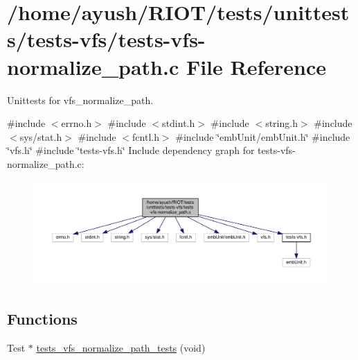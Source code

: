 \hypertarget{tests-vfs-normalize__path_8c}{}\section{/home/ayush/\+R\+I\+O\+T/tests/unittests/tests-\/vfs/tests-\/vfs-\/normalize\+\_\+path.c File Reference}
\label{tests-vfs-normalize__path_8c}


Unittests for vfs\+\_\+normalize\+\_\+path.  


{\ttfamily \#include $<$errno.\+h$>$}\newline
{\ttfamily \#include $<$stdint.\+h$>$}\newline
{\ttfamily \#include $<$string.\+h$>$}\newline
{\ttfamily \#include $<$sys/stat.\+h$>$}\newline
{\ttfamily \#include $<$fcntl.\+h$>$}\newline
{\ttfamily \#include \char`\"{}emb\+Unit/emb\+Unit.\+h\char`\"{}}\newline
{\ttfamily \#include \char`\"{}vfs.\+h\char`\"{}}\newline
{\ttfamily \#include \char`\"{}tests-\/vfs.\+h\char`\"{}}\newline
Include dependency graph for tests-\/vfs-\/normalize\+\_\+path.c\+:
\nopagebreak
\begin{figure}[H]
\begin{center}
\leavevmode
\includegraphics[width=350pt]{tests-vfs-normalize__path_8c__incl}
\end{center}
\end{figure}
\subsection*{Functions}
\textbf{ }\par
\begin{DoxyCompactItemize}
\item 
Test $\ast$ \hyperlink{tests-vfs-normalize__path_8c_abe821476b768ed80152215152e320355}{tests\+\_\+vfs\+\_\+normalize\+\_\+path\+\_\+tests} (void)
\end{DoxyCompactItemize}



